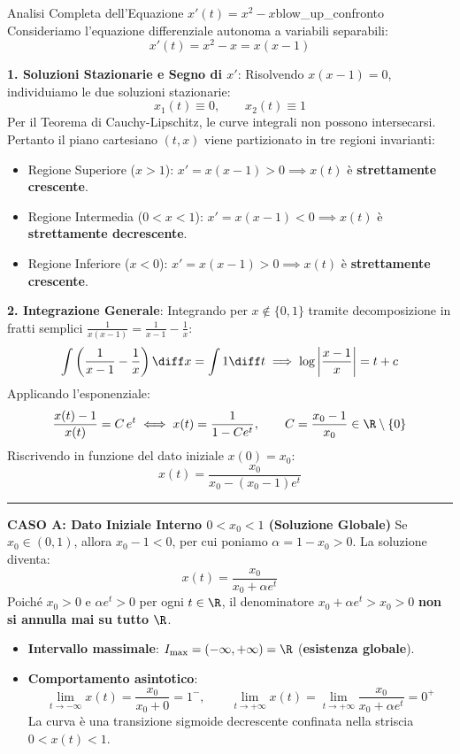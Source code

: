 \begin{esempio}{Analisi Completa dell'Equazione $x'(t) = x^2 - x$}{blow_up_confronto}
Consideriamo l'equazione differenziale autonoma a variabili separabili:
\begin{equation}
    \label{eq:riccati_base}
    x'(t) = x^2 - x = x(x-1)
\end{equation}

\textbf{1. Soluzioni Stazionarie e Segno di $x'$}:
Risolvendo $x(x-1) = 0$, individuiamo le due soluzioni stazionarie:
\[
    x_1(t) \equiv 0, \qquad x_2(t) \equiv 1
\]
Per il Teorema di Cauchy-Lipschitz, le curve integrali non possono intersecarsi. Pertanto il piano cartesiano $(t, x)$ viene partizionato in tre regioni invarianti:
\begin{itemize}
    \item Regione Superiore ($x > 1$): $x' = x(x-1) > 0 \implies x(t)$ è \textbf{strettamente crescente}.
    \item Regione Intermedia ($0 < x < 1$): $x' = x(x-1) < 0 \implies x(t)$ è \textbf{strettamente decrescente}.
    \item Regione Inferiore ($x < 0$): $x' = x(x-1) > 0 \implies x(t)$ è \textbf{strettamente crescente}.
\end{itemize}

\textbf{2. Integrazione Generale}:
Integrando per $x \notin \{0, 1\}$ tramite decomposizione in fratti semplici $\frac{1}{x(x-1)} = \frac{1}{x-1} - \frac{1}{x}$:
\[
    \int \left( \frac{1}{x-1} - \frac{1}{x} \right) \diff x = \int 1 \diff t \implies \log\left| \frac{x-1}{x} \right| = t + c
\]
Applicando l'esponenziale:
\begin{equation}
    \label{eq:sol_generale_riccati}
    \frac{x(t)-1}{x(t)} = C\, e^t \iff x(t) = \frac{1}{1 - C e^t}, \qquad C = \frac{x_0 - 1}{x_0} \in \R \setminus \{0\}
\end{equation}
Riscrivendo in funzione del dato iniziale $x(0) = x_0$:
\begin{equation}
    \label{eq:sol_x0_riccati}
    x(t) = \frac{x_0}{x_0 - (x_0 - 1) e^t}
\end{equation}

\rule{\textwidth}{0.4pt}

\noindent\textbf{CASO A: Dato Iniziale Interno $0 < x_0 < 1$ (Soluzione Globale)}
Se $x_0 \in (0, 1)$, allora $x_0 - 1 < 0$, per cui poniamo $\alpha = 1 - x_0 > 0$. La soluzione diventa:
\[
    x(t) = \frac{x_0}{x_0 + \alpha e^t}
\]
Poiché $x_0 > 0$ e $\alpha e^t > 0$ per ogni $t \in \R$, il denominatore $x_0 + \alpha e^t > x_0 > 0$ \textbf{non si annulla mai su tutto $\R$}.
\begin{itemize}
    \item \textbf{Intervallo massimale}: $I_{\text{max}} = (-\infty, +\infty) = \R$ (\textbf{esistenza globale}).
    \item \textbf{Comportamento asintotico}:
    \[
        \lim_{t \to -\infty} x(t) = \frac{x_0}{x_0 + 0} = 1^-, \qquad \lim_{t \to +\infty} x(t) = \lim_{t \to +\infty} \frac{x_0}{x_0 + \alpha e^t} = 0^+
    \]
    La curva è una transizione sigmoide decrescente confinata nella striscia $0 < x(t) < 1$.
\end{itemize}


\end{esempio}

